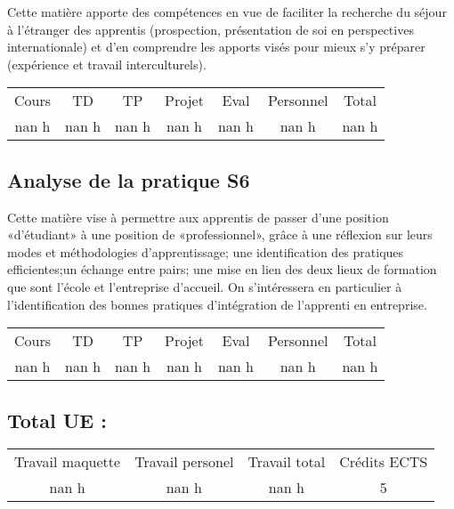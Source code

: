 %
Cette matière apporte des compétences en vue de faciliter la recherche du séjour à l'étranger des apprentis (prospection, présentation de soi en perspectives internationale) et d'en comprendre les apports visés pour mieux s'y préparer (expérience et travail interculturels).%
\begin{longtable}{c c c c c c c}%
\hline%
Cours&TD&TP&Projet&Eval&Personnel&Total\\%
nan h&nan h&nan h&nan h&nan h&nan h&nan h\\%
\hline%
\end{longtable}%
\subsection{Analyse de la pratique S6}%
\label{subsec:AnalysedelapratiqueS6}%

%
Cette matière vise à permettre aux apprentis de passer d’une position «d’étudiant» à une position de «professionnel», grâce à une réflexion sur leurs modes et méthodologies d’apprentissage; une identification des pratiques efficientes;un échange entre pairs; une mise en lien des deux lieux de formation que sont l’école et l’entreprise d’accueil. On s'intéressera en particulier à l'identification des bonnes pratiques d'intégration de l’apprenti en entreprise.%
\begin{longtable}{c c c c c c c}%
\hline%
Cours&TD&TP&Projet&Eval&Personnel&Total\\%
nan h&nan h&nan h&nan h&nan h&nan h&nan h\\%
\hline%
\end{longtable}%
\subsection{Total UE :}%
\label{subsec:TotalUE}%

%
\begin{longtable}{c c c c}%
\hline%
Travail maquette&Travail personel&Travail total&Crédits ECTS\\%
nan h&nan h&nan h&5\\%
\hline%
\end{longtable}